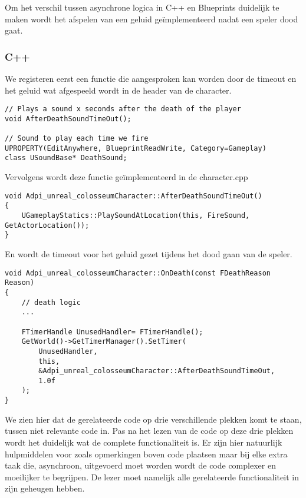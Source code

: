 Om het verschil tussen asynchrone logica in C++ en Blueprints duidelijk te maken wordt het afspelen van een geluid geïmplementeerd nadat een speler dood gaat.

\subsubsection{C++}
We registeren eerst een functie die aangesproken kan worden door de timeout en het geluid wat afgespeeld wordt in de header van de character.

\begin{lstlisting}[caption=Registratie van de timeout functie en het geluid]	
// Plays a sound x seconds after the death of the player
void AfterDeathSoundTimeOut();

// Sound to play each time we fire
UPROPERTY(EditAnywhere, BlueprintReadWrite, Category=Gameplay)
class USoundBase* DeathSound;
\end{lstlisting}

Vervolgens wordt deze functie geïmplementeerd in de character.cpp

\begin{lstlisting}[caption=Registratie van de timeout functie en het geluid]
void Adpi_unreal_colosseumCharacter::AfterDeathSoundTimeOut() 
{
	UGameplayStatics::PlaySoundAtLocation(this, FireSound, GetActorLocation());
}
\end{lstlisting}

En wordt de timeout voor het geluid gezet tijdens het dood gaan van de speler.

\begin{lstlisting}[caption=Implementatie van de OnDeath functie]
void Adpi_unreal_colosseumCharacter::OnDeath(const FDeathReason Reason)
{
	// death logic
	...

	FTimerHandle UnusedHandler= FTimerHandle();
	GetWorld()->GetTimerManager().SetTimer(
		UnusedHandler, 
		this, 
		&Adpi_unreal_colosseumCharacter::AfterDeathSoundTimeOut, 
		1.0f
	);
}
\end{lstlisting}

We zien hier dat de gerelateerde code op drie verschillende plekken komt te staan, tussen niet relevante code in. Pas na het lezen van de code op deze drie plekken wordt het duidelijk wat de complete functionaliteit is. Er zijn hier natuurlijk hulpmiddelen voor zoals opmerkingen boven code plaatsen maar bij elke extra taak die, asynchroon, uitgevoerd moet worden wordt de code complexer en moeilijker te begrijpen. De lezer moet namelijk alle gerelateerde functionaliteit in zijn geheugen hebben.

